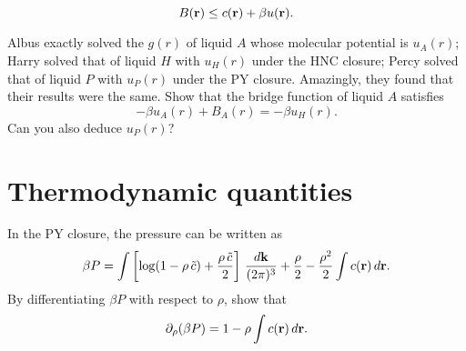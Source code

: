 \documentclass{book}
\begin{document}
\begin{equation}
  B(\boldsymbol{\mathbf{r}}) \le c(\boldsymbol{\mathbf{r}}) + \beta u(\boldsymbol{\mathbf{r}}).
\end{equation}





Albus exactly solved the $g(r)$ of liquid $A$ whose molecular potential is $u_A(r)$;
Harry solved that of liquid $H$ with $u_H(r)$ under the HNC closure;
Percy solved that of liquid $P$ with $u_P(r)$ under the PY closure.
Amazingly, they found that their results were the same.
Show that the bridge function of liquid $A$ satisfies
\begin{equation}
  -\beta u_A(r) + B_A(r) = -\beta u_H(r).
\end{equation}
Can you also deduce $u_P(r)$?



\section{Thermodynamic quantities}




In the PY closure, the pressure can be written as\cite{baxterpressure}
\begin{align}
  \beta P =  \int \left[
    \log(1-\rho \,\tilde{c}) + \frac{ \rho \, \tilde{c} }{2}
  \right] \, \frac{ d \boldsymbol{\mathbf{k}} }{(2\pi)^3}
  +
  \frac{\rho}{2}
  - \frac{\rho^2}{2} \int c(\boldsymbol{\mathbf{r}}) \, d\boldsymbol{\mathbf{r}}.
  \label{eq:Pbaxter}
\end{align}
%
By differentiating $\beta P$ with respect to $\rho$,
show that
\begin{align}
  \partial_\rho (\beta P) = 1 - \rho \int c(\boldsymbol{\mathbf{r}}) \, d\boldsymbol{\mathbf{r}}.
\end{align}

\end{document}
